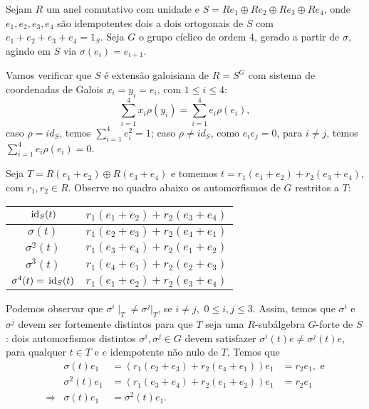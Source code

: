 \begin{exemplo}
Sejam $R$ um anel comutativo com unidade e $S=Re_1 \oplus Re_2 \oplus Re_3 \oplus Re_4$, onde $e_1,e_2,e_3,e_4$ são idempotentes dois a dois ortogonais de $S$ com $e_1 + e_2 + e_3 + e_4 = 1_S$. Seja $G$ o grupo cíclico de ordem 4, gerado a partir de $\sigma$, agindo em $S$ via $\sigma(e_i) = e_{i+1}$. 

Vamos verificar que $S$ é extensão galoisiana de $R = S^G$ com sistema de coordenadas de Galois $x_i = y_i = e_i$, com $1\leq i \leq 4$:
\[\sum_{i=1}^{4} x_i \rho(y_i)= \sum_{i=1}^{4} e_i \rho(e_i), \]
caso $\rho = id_S$, temos $\sum_{i=1}^4 e_i^2 = 1$; caso $\rho \neq id_S$, como $e_i e_j = 0$, para $i \neq j$, temos $\sum_{i=1}^4 e_i \rho(e_i) = 0$.

Seja $T=R(e_1+e_2)\oplus R(e_3+e_4)$ e tomemos $t = r_1(e_1+e_2) + r_2(e_3 + e_4)$, com $r_1, r_2 \in R$.  Observe no quadro abaixo os automorfismos de $G$ restritos a $T$:

\begin{table}[ht]
\centering
\begin{tabular}{|c|l|}
\hline
$\, \textrm{id}_{S} (t)$          & $r_1(e_1+e_2)+r_2(e_3+e_4)$ \\ \hline
$\sigma (t)$          & $r_1(e_2+e_3)+r_2(e_4+e_1)$ \\ \hline
$\sigma^2 (t)$        & $r_1(e_3+e_4)+r_2(e_1+e_2)$ \\ \hline
$\sigma^3(t)$        & $r_1(e_4+e_1)+r_2(e_2+e_3)$ \\ \hline
$\sigma^4(t)=\, \textrm{id}_{S}(t)$ & $r_1(e_1+e_2)+r_2(e_3+e_4)$ \\ \hline
\end{tabular}
\end{table}

Podemos observar que $\sigma^{i}\mid_T \neq \sigma^{j}|_T$, se $i\neq j,$ $0 \leq i, j \leq 3$. Assim, temos que $\sigma^{i}$ e $\sigma^{j}$ devem ser fortemente distintos para que $T$ seja uma $R$-subálgebra $G$-forte de $S$: dois automorfismos distintos $\sigma^{i}, \sigma^{j} \in G$ devem satisfazer $\sigma^{i}(t)e \neq \sigma^{j}(t)e$, para qualquer $t \in T$ e $e$ idempotente não nulo de $T$. Temos que
\[\begin{array}{rrll}
& \sigma(t) e_1 &= \left(r_1(e_2+e_3)+r_2(e_4+e_1)\right)e_1 &= r_2e_1, \text{ e} \\
& \sigma^2(t)e_1 &= \left(r_1(e_3+e_4)+r_2(e_1+e_2)\right)e_1 &= r_2e_1 \\
\Rightarrow & \sigma(t)e_1 &=\sigma^2(t)e_1. &
\end{array}\]


\end{exemplo}
